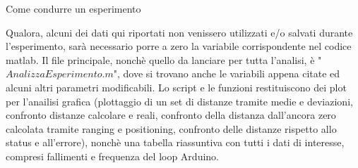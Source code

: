 \documentclass[12pt]{report}
\begin{document}
\begin{section}{Come condurre un esperimento}
\begin{enumerate}
						\begin{table}[H]
							\centering
{}
						\end{table}
 						Qualora, alcuni dei dati qui riportati non venissero utilizzati e/o salvati durante l'esperimento, sarà necessario porre a zero la variabile corrispondente nel codice matlab. Il file principale, nonchè quello da lanciare per tutta l'analisi, è  "$AnalizzaEsperimento.m$", dove si trovano anche le variabili appena 								citate ed alcuni altri parametri modificabili. Lo script e le funzioni restituiscono dei plot per l'anailisi grafica (plottaggio di un set di distanze tramite medie e deviazioni, confronto distanze calcolare e reali, confronto della distanza dall'ancora zero calcolata tramite ranging e positioning, confronto delle 									distanze rispetto allo status e all'errore), nonchè una tabella riassuntiva con tutti i dati di interesse, compresi fallimenti e frequenza del loop Arduino.
		\end{enumerate}

	\end{section}	
	\newpage
\end{document}
